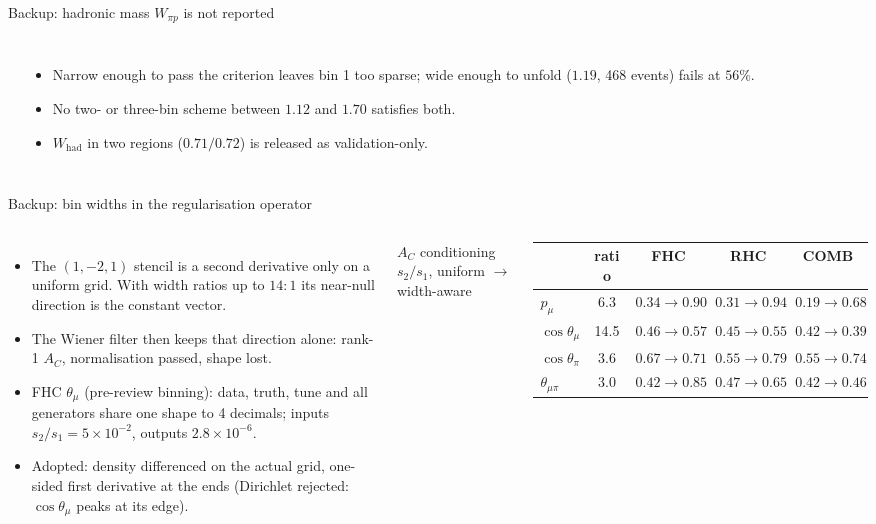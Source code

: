 \documentclass[aspectratio=169,10pt]{beamer}
\begin{document}
\begin{frame}{Backup: hadronic mass $W_{\pi p}$ is not reported}
\begin{columns}[T]
\begin{center}
  \end{center}
  \begin{itemize}\setlength\itemsep{1pt}
    \item Narrow enough to pass the criterion leaves bin 1 too sparse; wide enough to unfold ($1.19$, 468 events) fails at $56\%$.
    \item No two- or three-bin scheme between $1.12$ and $1.70$ satisfies both.
    \item $W_\mathrm{had}$ in two regions ($0.71/0.72$) is released as validation-only.
  \end{itemize}
  \end{columns}
\end{frame}

\begin{frame}{Backup: bin widths in the regularisation operator}
  \begin{columns}[T]
  \small
  \begin{itemize}\setlength\itemsep{3pt}
    \item The $(1,-2,1)$ stencil is a second derivative only on a uniform grid. With width ratios up to
      $14{:}1$ its near-null direction is the constant vector.
    \item The Wiener filter then keeps that direction alone: rank-1 $A_C$, normalisation passed, shape lost.
    \item FHC $\theta_\mu$ (pre-review binning): data, truth, tune and all generators share one shape to 4
      decimals; inputs $s_2/s_1=5\times10^{-2}$, outputs $2.8\times10^{-6}$.
    \item Adopted: density differenced on the actual grid, one-sided first derivative at the ends
      (Dirichlet rejected: $\cos\theta_\mu$ peaks at its edge).
  \end{itemize}
  \scriptsize\centering\setlength{\tabcolsep}{2.5pt}
  $A_C$ conditioning $s_2/s_1$, uniform $\to$ width-aware\\[1mm]
  \begin{tabular}{lcccc}
    \toprule
    & ratio & FHC & RHC & COMB \\\midrule
    $p_\mu$ & 6.3 & $0.34\to0.90$ & $0.31\to0.94$ & $0.19\to0.68$ \\
    $\cos\theta_\mu$ & 14.5 & $0.46\to0.57$ & $0.45\to0.55$ & $0.42\to0.39$ \\
    $\cos\theta_\pi$ & 3.6 & $0.67\to0.71$ & $0.55\to0.79$ & $0.55\to0.74$ \\
    $\theta_{\mu\pi}$ & 3.0 & $0.42\to0.85$ & $0.47\to0.65$ & $0.42\to0.46$ \\

\end{tabular}
\end{columns}
\end{frame}
\end{document}
